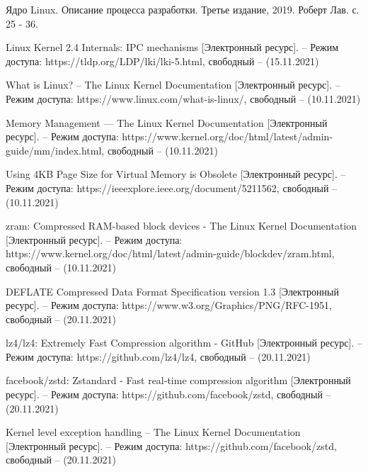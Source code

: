 \begin{thebibliography}{}
	Ядро Linux. Описание процесса разработки. Третье издание, 2019. Роберт Лав. с. 25 - 36.
	
	Linux Kernel 2.4 Internals: IPC mechanisms [Электронный ресурс]. – Режим доступа: https://tldp.org/LDP/lki/lki-5.html, свободный – (15.11.2021)
	 
	 What is Linux? -- The Linux Kernel Documentation [Электронный ресурс]. – Режим доступа: https://www.linux.com/what-is-linux/, свободный – (10.11.2021)
	
	Memory Management — The Linux Kernel Documentation [Электронный ресурс]. – Режим доступа: https://www.kernel.org/doc/html/latest/admin-guide/mm/index.html, свободный – (10.11.2021)
	
	Using 4KB Page Size for Virtual Memory is Obsolete [Электронный ресурс]. – Режим доступа: https://ieeexplore.ieee.org/document/5211562, свободный – (10.11.2021)
	
	zram: Compressed RAM-based block devices - The Linux Kernel Documentation [Электронный ресурс]. – Режим доступа: https://www.kernel.org/doc/html/latest/admin-guide/blockdev/zram.html, свободный – (10.11.2021)
	
	DEFLATE Compressed Data Format Specification version 1.3 [Электронный ресурс]. – Режим доступа: https://www.w3.org/Graphics/PNG/RFC-1951, свободный – (20.11.2021)
	
	lz4/lz4: Extremely Fast Compression algorithm - GitHub [Электронный ресурс]. – Режим доступа: https://github.com/lz4/lz4, свободный – (20.11.2021)
	
	facebook/zstd: Zstandard - Fast real-time compression algorithm [Электронный ресурс]. – Режим доступа: https://github.com/facebook/zstd, свободный – (20.11.2021)
	
	Kernel level exception handling -- The Linux Kernel Documentation [Электронный ресурс]. – Режим доступа: https://github.com/facebook/zstd, свободный – (20.11.2021)
	
\end{thebibliography}
\endgroup

\pagebreak